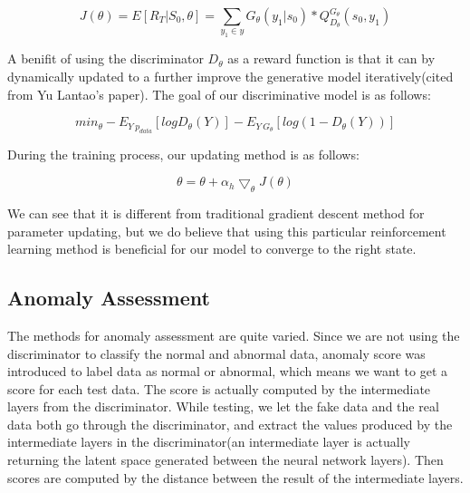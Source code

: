 \documentclass{acmtog} %
\begin{document}
\begin{equation}
J(\theta) = E[R_T|S_0, \theta] = \sum_{y_1 \in y} G_\theta(y_1|s_0) * Q_{D_\theta}^{G_\theta}(s_0, y_1)
\label{eq:samplevar}
\end{equation}

A benifit of using the discriminator $D_\theta$ as a reward function is that it can by dynamically updated to a further improve the generative model iteratively(cited from Yu Lantao's paper). The goal of our discriminative model is as follows:

\begin{equation}
min_\theta -E_{Y~p_{data}}[logD_\theta(Y)] - E_{Y~G_\theta}[log(1-D_\theta(Y))]
\label{eq:samplevar}
\end{equation}

During the training process, our updating method is as follows:

\begin{equation}
\theta = \theta + \alpha_{h} \bigtriangledown_{\theta} J(\theta)
\label{eq:samplevar}
\end{equation}

We can see that it is different from traditional gradient descent method for parameter updating, but we do believe that using this particular reinforcement learning method is beneficial for our model to converge to the right state.

\subsection{Anomaly Assessment}
The methods for anomaly assessment are quite varied. Since we are not using the discriminator to classify the normal and abnormal data, anomaly score was introduced to label data as normal or abnormal, which means we want to get a score for each test data. The score is actually computed by the intermediate layers from the discriminator. While testing, we let the fake data and the real data both go through the discriminator, and extract the values produced by the intermediate layers in the discriminator(an intermediate layer is actually returning the latent space generated between the neural network layers). Then scores are computed by the distance between the result of the intermediate layers. 
\end{document}
